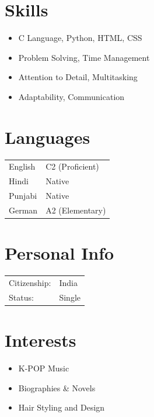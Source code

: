 \documentclass[11pt,a4paper]{article}
\begin{document}
\hfill
\begin{minipage}[t]{0.34\textwidth}
    \section*{Skills}
    \begin{itemize}[noitemsep, leftmargin=10pt]
        \item C Language, Python, HTML, CSS
        \item Problem Solving, Time Management
        \item Attention to Detail, Multitasking
        \item Adaptability, Communication
    \end{itemize}

    \section*{Languages}
    \begin{tabular}{ll}
        English & C2 (Proficient) \\
        Hindi & Native \\
        Punjabi & Native \\
        German & A2 (Elementary)
    \end{tabular}

    \vspace{8pt}
    \section*{Personal Info}
    \begin{tabular}{ll}
        Citizenship: & India \\
        Status: & Single
    \end{tabular}

    \vspace{8pt}
    \section*{Interests}
    \begin{itemize}[noitemsep, leftmargin=10pt]
        \item K-POP Music
        \item Biographies \& Novels
        \item Hair Styling and Design
    \end{itemize}

\end{minipage}
\end{document}

